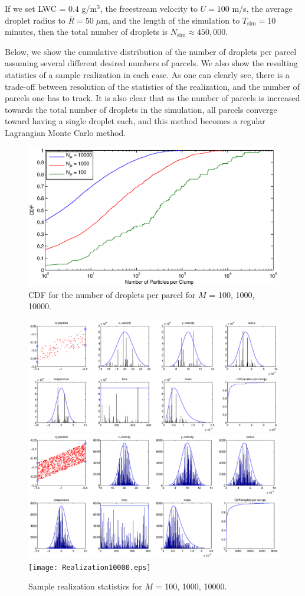 \documentclass{article}
\begin{document}
If we set LWC = $0.4$ g/m$^3$, the freestream velocity to $U = 100$ m/s, the average droplet radius to $\overline{R} = 50 \; \mu$m, and the 
length of the simulation to $T_{\text{sim}} = 10$ minutes, then the total number of droplets is $N_{\text{sim}} \approx 450,000$. 

Below, we 
show the cumulative distribution of the number of droplets per parcel assuming several different desired numbers of parcels. We also 
show the resulting statistics of a sample realization in each case. As one can clearly see, there is a trade-off between resolution of the 
statistics of the realization, and the number of parcels one has to track. It is also clear that as the number of parcels is increased towards 
the total number of droplets in the simulation, all parcels converge toward having a single droplet each, and this method becomes a 
regular Lagrangian Monte Carlo method.
\begin{figure}
\centering
\includegraphics[width=.5\textwidth] {CDFClump.eps}
\caption{CDF for the number of droplets per parcel for $M$ = 100, 1000, 10000.}
\end{figure}

\begin{figure}
\centering
\includegraphics[width=\textwidth] {Realization100.eps}
\includegraphics[width=\textwidth] {Realization1000.eps}
\texttt{[image: Realization10000.eps]}
\caption{Sample realization statistics for $M$ = 100, 1000, 10000.}
\end{figure}
\end{document}
